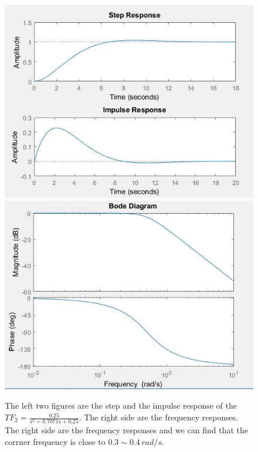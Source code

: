 \documentclass[12pt,a4paper]{article}
\begin{document}
			\begin{figure}[H]
				\includegraphics[scale=0.55]{Problem2c}
				\includegraphics[scale=0.56]{Problem2d}
				\caption[Properties of the second filter]{The left two figures are the step and the impulse response of the $TF_{2}=\frac{0.25}{s^{2}=0.7071s+0.25}$. The right side are the frequency responses. The right side are the frequency responses and we can find that the corrner frequency is close to $0.3\sim0.4\, rad/s.$}
			\end{figure}
\end{document}
